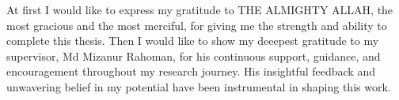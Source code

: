 \newpage
{}

At first I would like to express my gratitude to THE ALMIGHTY ALLAH, the most gracious and the most merciful, for giving me the strength and ability to complete this thesis. Then I would like to show my deeepest gratitude to my supervisor, Md Mizanur Rahoman, for his continuous support, guidance, and encouragement throughout my research journey. His insightful feedback and unwavering belief in my potential have been instrumental in shaping this work.